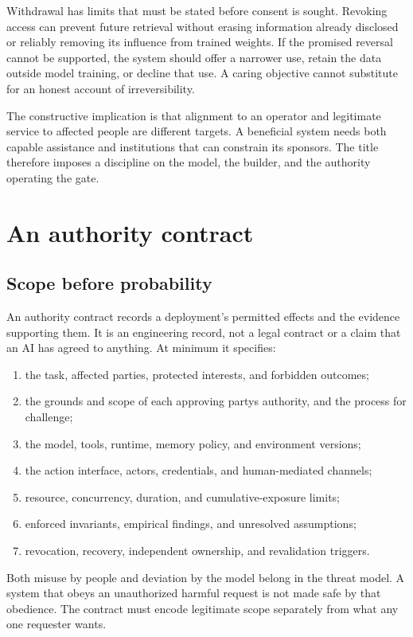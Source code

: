\documentclass[10pt,twocolumn,letterpaper]{article}
\begin{document}
Withdrawal has limits that must be stated before consent is sought. Revoking access can prevent future retrieval without erasing information already disclosed or reliably removing its influence from trained weights. If the promised reversal cannot be supported, the system should offer a narrower use, retain the data outside model training, or decline that use. A caring objective cannot substitute for an honest account of irreversibility.

The constructive implication is that alignment to an operator and legitimate service to affected people are different targets. A beneficial system needs both capable assistance and institutions that can constrain its sponsors. The title therefore imposes a discipline on the model, the builder, and the authority operating the gate.

\section{An authority contract}
\label{sec:contract}

\subsection{Scope before probability}
An authority contract records a deployment's permitted effects and the evidence supporting them. It is an engineering record, not a legal contract or a claim that an AI has agreed to anything. At minimum it specifies:
\begin{enumerate}
\item the task, affected parties, protected interests, and forbidden outcomes;
\item the grounds and scope of each approving party\textquotesingle s authority, and the process for challenge;
\item the model, tools, runtime, memory policy, and environment versions;
\item the action interface, actors, credentials, and human-mediated channels;
\item resource, concurrency, duration, and cumulative-exposure limits;
\item enforced invariants, empirical findings, and unresolved assumptions;
\item revocation, recovery, independent ownership, and revalidation triggers.
\end{enumerate}
Both misuse by people and deviation by the model belong in the threat model. A system that obeys an unauthorized harmful request is not made safe by that obedience. The contract must encode legitimate scope separately from what any one requester wants.
\end{document}
